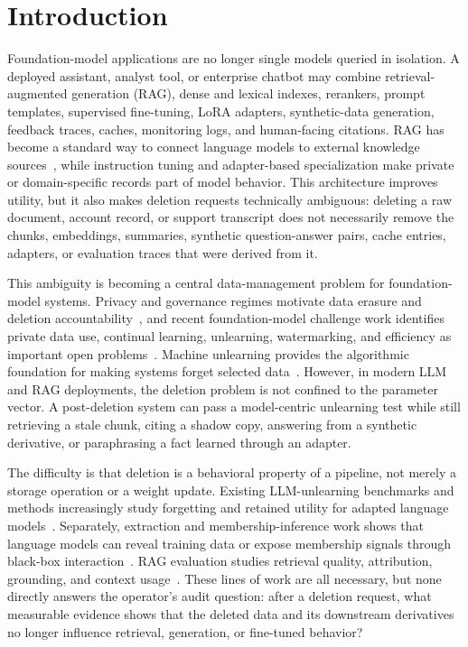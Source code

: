 \section{Introduction}

Foundation-model applications are no longer single models queried in isolation. A deployed assistant, analyst tool, or enterprise chatbot may combine retrieval-augmented generation (RAG), dense and lexical indexes, rerankers, prompt templates, supervised fine-tuning, LoRA adapters, synthetic-data generation, feedback traces, caches, monitoring logs, and human-facing citations. RAG has become a standard way to connect language models to external knowledge sources~\cite{lewis2020rag,karpukhin2020dpr,izacard2021fid,gao2024ragsurvey}, while instruction tuning and adapter-based specialization make private or domain-specific records part of model behavior. This architecture improves utility, but it also makes deletion requests technically ambiguous: deleting a raw document, account record, or support transcript does not necessarily remove the chunks, embeddings, summaries, synthetic question-answer pairs, cache entries, adapters, or evaluation traces that were derived from it.

This ambiguity is becoming a central data-management problem for foundation-model systems. Privacy and governance regimes motivate data erasure and deletion accountability~\cite{voigt2017gdpr,cohen2022deletioncontrol}, and recent foundation-model challenge work identifies private data use, continual learning, unlearning, watermarking, and efficiency as important open problems~\cite{fan2025fedfmchallenges}. Machine unlearning provides the algorithmic foundation for making systems forget selected data~\cite{cao2015machineunlearning,ginart2019making,bourtoule2021machineunlearning,guo2020certified}. However, in modern LLM and RAG deployments, the deletion problem is not confined to the parameter vector. A post-deletion system can pass a model-centric unlearning test while still retrieving a stale chunk, citing a shadow copy, answering from a synthetic derivative, or paraphrasing a fact learned through an adapter.

The difficulty is that deletion is a behavioral property of a pipeline, not merely a storage operation or a weight update. Existing LLM-unlearning benchmarks and methods increasingly study forgetting and retained utility for adapted language models~\cite{maini2024tofu,yao2024largeunlearning,liu2024rethinking,wang2024llmunlearning,jin2024surveyunlearning}. Separately, extraction and membership-inference work shows that language models can reveal training data or expose membership signals through black-box interaction~\cite{carlini2019secretsharer,carlini2021extracting,carlini2023quantifying,shokri2017membership,yeom2018privacy,mattern2023membership}. RAG evaluation studies retrieval quality, attribution, grounding, and context usage~\cite{gao2023retrievalaugmented,asai2024selfrag,yu2024ragevalsurvey,akkiraju2024facts}. These lines of work are all necessary, but none directly answers the operator's audit question: after a deletion request, what measurable evidence shows that the deleted data and its downstream derivatives no longer influence retrieval, generation, or fine-tuned behavior?

